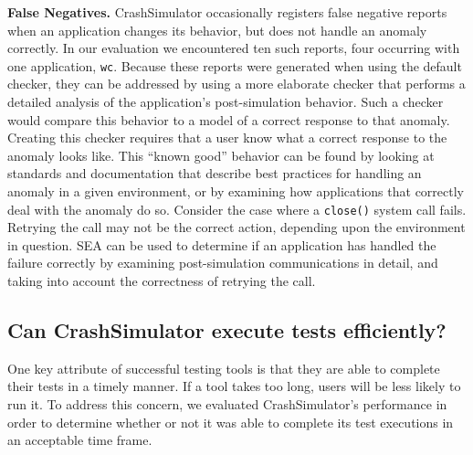 
\textbf{False Negatives.}
CrashSimulator occasionally registers  false negative reports
when an application changes its behavior,
but does not handle an anomaly correctly.
In our evaluation we encountered ten such reports, four
occurring with one application, {\tt wc}.
Because these reports were generated when using the default checker,
they can be addressed by
using a more elaborate checker that
performs a detailed analysis
of the application's post-simulation behavior.
Such a checker would compare this behavior to a model of
a correct response to that anomaly.
Creating this checker requires
that a user know
what a correct response
to the anomaly looks like.
This ``known good'' behavior can be found
by looking at standards and documentation
that describe best practices for handling an anomaly
in a given environment,
or by examining how applications that correctly
deal with the anomaly do so.
Consider the case where a {\tt close()} system call fails.
Retrying the call may not be the correct action,
depending upon the environment in question.
SEA can be used to determine if an application
has handled the failure correctly
by examining post-simulation communications in detail,
and taking into account the correctness of retrying the call.

\subsection{Can CrashSimulator execute tests efficiently?}
\label{sec-perf}

One key attribute of successful testing tools is that they are able to
complete their tests in a timely manner.  If a tool takes too long,
users will be less likely to run it.
To address this concern,
we evaluated CrashSimulator's performance
in order to determine whether or not it was able to complete its
test executions in an acceptable time frame.

